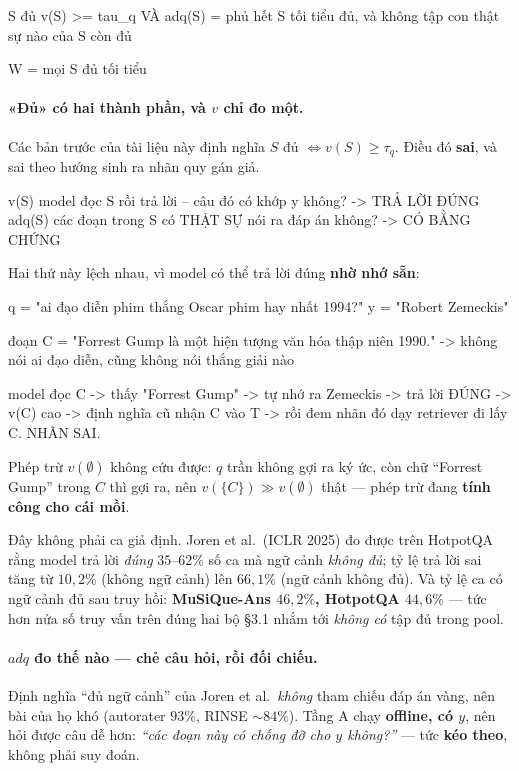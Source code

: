 \documentclass[11pt,a4paper]{article}
\begin{document}
\begin{dia}
S đủ         v(S) >= tau_q        VÀ     adq(S) = phủ hết
S tối tiểu   đủ,  và không tập con thật sự nào của S còn đủ

W  =  { mọi S đủ tối tiểu }
\end{dia}

\paragraph{«Đủ» có hai thành phần, và $v$ chỉ đo một.} Các bản trước của tài liệu này định
nghĩa $S$ đủ $\iff v(S)\ge\tau_q$. Điều đó \textbf{sai}, và sai theo hướng sinh ra nhãn quy
gán giả.

\begin{dia}
v(S)      model đọc S rồi trả lời -- câu đó có khớp y không?     ->  TRẢ LỜI ĐÚNG
adq(S)    các đoạn trong S có THẬT SỰ nói ra đáp án không?       ->  CÓ BẰNG CHỨNG
\end{dia}

Hai thứ này lệch nhau, vì model có thể trả lời đúng \textbf{nhờ nhớ sẵn}:

\begin{dia}
q = "ai đạo diễn phim thắng Oscar phim hay nhất 1994?"     y = "Robert Zemeckis"

đoạn C = "Forrest Gump là một hiện tượng văn hóa thập niên 1990."
         -> không nói ai đạo diễn, cũng không nói thắng giải nào

model đọc C -> thấy "Forrest Gump" -> tự nhớ ra Zemeckis -> trả lời ĐÚNG
->  v({C}) cao  ->  định nghĩa cũ nhận C vào T
->  rồi đem nhãn đó dạy retriever đi lấy C.   NHÃN SAI.
\end{dia}

Phép trừ $v(\emptyset)$ không cứu được: $q$ trần không gợi ra ký ức, còn chữ ``Forrest Gump''
trong $C$ thì gợi ra, nên $v(\{C\})\gg v(\emptyset)$ thật --- phép trừ đang \textbf{tính công
cho cái mồi}.

Đây không phải ca giả định. Joren et al.\ (ICLR 2025) đo được trên HotpotQA rằng model trả
lời \emph{đúng} $35$--$62\%$ số ca mà ngữ cảnh \emph{không đủ}; tỷ lệ trả lời sai tăng từ
$10{,}2\%$ (không ngữ cảnh) lên $66{,}1\%$ (ngữ cảnh không đủ). Và tỷ lệ ca có ngữ cảnh đủ
sau truy hồi: \textbf{MuSiQue-Ans $46{,}2\%$, HotpotQA $44{,}6\%$} --- tức hơn nửa số truy vấn
trên đúng hai bộ \S3.1 nhắm tới \emph{không có} tập đủ trong pool.

\paragraph{$adq$ đo thế nào --- chẻ câu hỏi, rồi đối chiếu.} Định nghĩa ``đủ ngữ cảnh'' của
Joren et al.\ \emph{không} tham chiếu đáp án vàng, nên bài của họ khó (autorater $93\%$, RINSE
${\sim}84\%$). Tầng A chạy \textbf{offline, có $y$}, nên hỏi được câu dễ hơn: \emph{``các đoạn
này có chống đỡ cho $y$ không?''} --- tức \textbf{kéo theo}, không phải suy đoán.
\end{document}
